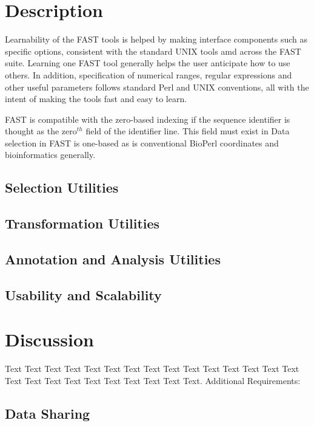 \documentclass{frontiersSCNS} %
\begin{document}
\section{Description}

Learnability of the FAST tools is helped by making interface
components such as specific options, consistent with the standard UNIX
tools amd across the FAST suite. Learning one FAST tool generally
helps the user anticipate how to use others. In addition,
specification of numerical ranges, regular expressions and other
useful parameters follows standard Perl and UNIX conventions, all with
the intent of making the tools fast and easy to learn.

FAST is compatible with the zero-based indexing if the sequence
identifier is thought as the zero$^{th}$ field of the identifier
line. This field must exist in Data selection in FAST is
one-based as is conventional BioPerl coordinates and bioinformatics
generally.

\subsection{Selection Utilities}

\subsection{Transformation Utilities}


\subsection{Annotation and Analysis Utilities}
\subsection{Usability and Scalability}


\section{Discussion}

Text Text Text Text Text Text  Text Text Text Text Text Text Text Text Text  Text Text Text Text Text Text Text Text Text Text.
Additional Requirements:
\subsection{Data Sharing}
\end{document}

